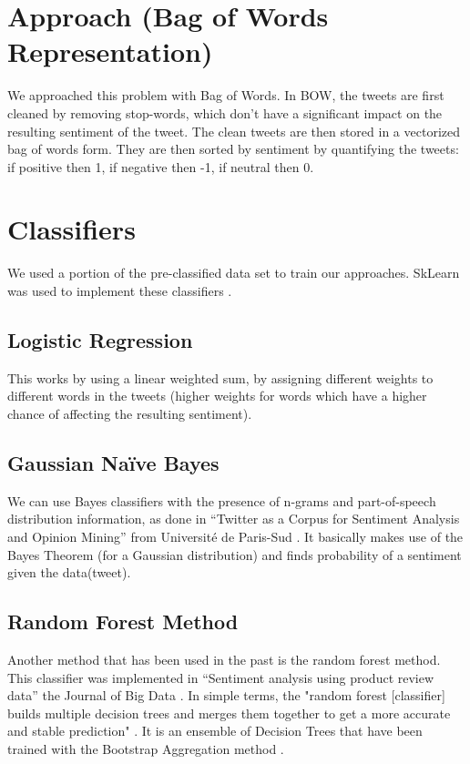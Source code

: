 \documentclass[]{IEEEtran}
\begin{document}
\section{Approach (Bag of Words Representation)}
We approached this problem with Bag of Words. In BOW, the tweets are first cleaned by removing stop-words, which don't have a significant impact on the resulting sentiment of the tweet. The clean tweets are then stored in a vectorized bag of words form. They are then sorted by sentiment by quantifying the tweets: if positive then 1, if negative then -1, if neutral then 0.

\section{Classifiers}
We used a portion of the pre-classified data set to train our approaches. SkLearn was used to implement these classifiers \cite{scikit-learn}.

\subsection{Logistic Regression}
This works by using a linear weighted sum, by assigning different weights to different words in the tweets (higher weights for words which have a higher chance of affecting the resulting sentiment).

\subsection{Gaussian Na{\"i}ve Bayes}
We can use Bayes classifiers with the presence of n-grams and part-of-speech
distribution information, as done in “Twitter as a Corpus for Sentiment Analysis
and Opinion Mining” from Universit{\'e} de Paris-Sud \cite{pak2010twitter}.
It basically makes use of the Bayes Theorem (for a Gaussian distribution) and finds probability of a sentiment given the data(tweet).

\subsection{Random Forest Method}
Another method that has been used in the past is the random forest
method. This classifier was implemented in “Sentiment analysis using product review data” the Journal of Big Data \cite{fang2015sentiment}. In simple terms, the "random forest [classifier] builds multiple decision trees and merges them together to get a more accurate and stable prediction" \cite{TheRando29}. It is an ensemble of Decision Trees that have been trained with the Bootstrap Aggregation method \cite{Brownlee}.
\end{document}
